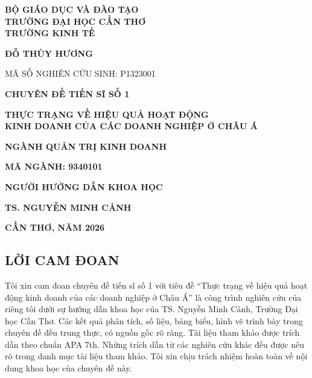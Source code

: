 \documentclass[
  a4paper,
  13pt]{extreport}
\author{}
\date{}
\begin{document}
\thispagestyle{empty}
\begin{center}
{\fontsize{14}{18}\selectfont\bfseries BỘ GIÁO DỤC VÀ ĐÀO TẠO\\TRƯỜNG ĐẠI HỌC CẦN THƠ\\TRƯỜNG KINH TẾ}

\vspace{1.8cm}
{\fontsize{14}{18}\selectfont\bfseries ĐỖ THÙY HƯƠNG}

{\fontsize{13}{17}\selectfont MÃ SỐ NGHIÊN CỨU SINH: P1323001}

\vspace{1.6cm}
{\fontsize{14}{18}\selectfont\bfseries CHUYÊN ĐỀ TIẾN SĨ SỐ 1}

\vspace{0.7cm}
{\fontsize{18}{24}\selectfont\bfseries THỰC TRẠNG VỀ HIỆU QUẢ HOẠT ĐỘNG\\KINH DOANH CỦA CÁC DOANH NGHIỆP Ở CHÂU Á}

\vspace{1.6cm}
{\fontsize{14}{18}\selectfont\bfseries NGÀNH QUẢN TRỊ KINH DOANH}

{\fontsize{14}{18}\selectfont\bfseries MÃ NGÀNH: 9340101}

\vspace{1.2cm}
{\fontsize{13}{17}\selectfont\bfseries NGƯỜI HƯỚNG DẪN KHOA HỌC}

{\fontsize{13}{17}\selectfont\bfseries TS. NGUYỄN MINH CẢNH}

\vspace{1.4cm}
{\fontsize{14}{18}\selectfont\bfseries CẦN THƠ, NĂM 2026}
\end{center}
\newpage

\hypertarget{lux1eddi-cam-ux111oan}{%
\subsection{LỜI CAM ĐOAN}\label{lux1eddi-cam-ux111oan}}

Tôi xin cam đoan chuyên đề tiến sĩ số 1 với tiêu đề ``Thực trạng về hiệu
quả hoạt động kinh doanh của các doanh nghiệp ở Châu Á'' là công trình
nghiên cứu của riêng tôi dưới sự hướng dẫn khoa học của TS. Nguyễn Minh
Cảnh, Trường Đại học Cần Thơ. Các kết quả phân tích, số liệu, bảng biểu,
hình vẽ trình bày trong chuyên đề đều trung thực, có nguồn gốc rõ ràng.
Tài liệu tham khảo được trích dẫn theo chuẩn APA 7th. Những trích dẫn từ
các nghiên cứu khác đều được nêu rõ trong danh mục tài liệu tham khảo.
Tôi xin chịu trách nhiệm hoàn toàn về nội dung khoa học của chuyên đề
này.
\end{document}
